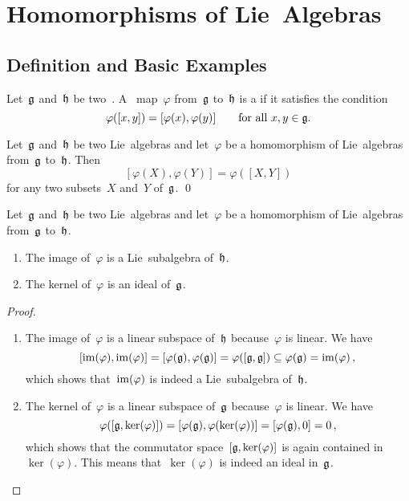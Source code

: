 \section{Homomorphisms of Lie~Algebras}



\subsection{Definition and Basic Examples}


\begin{definition}
	Let~$\mathfrak{g}$ and~$\mathfrak{h}$ be two~\liealgebras{$\kf$}.
	A~\linear{$\kf$} map~$\varphi$ from~$\mathfrak{g}$ to~$\mathfrak{h}$ is a  if it satisfies the condition
 \[
	 \varphi([x,y])
	 =
	 [\varphi(x), \varphi(y)]
	 \qquad
	 \text{for all~$x, y \in \mathfrak{g}$.}
 \]
\end{definition}


\begin{proposition}
	Let~$\mathfrak{g}$ and~$\mathfrak{h}$ be two Lie~algebras and let~$\varphi$ be a homomorphism of Lie~algebras from~$\mathfrak{g}$ to~$\mathfrak{h}$.
	Then
	\[
		[ \varphi(X), \varphi(Y) ]
		=
		\varphi( [X, Y] )
	\]
	for any two subsets~$X$ and~$Y$ of~$\mathfrak{g}$.
	\qed
\end{proposition}


\begin{proposition}
	Let~$\mathfrak{g}$ and~$\mathfrak{h}$ be two Lie~algebras and let~$\varphi$ be a homomorphism of Lie~algebras from~$\mathfrak{g}$ to~$\mathfrak{h}$.
	\begin{enumerate}
		\item
			The image of~$\varphi$ is a Lie~subalgebra of~$\mathfrak{h}$.
		\item
			The kernel of~$\varphi$ is an ideal of~$\mathfrak{g}$.
	\end{enumerate}
\end{proposition}


\begin{proof}
	\leavevmode
	\begin{enumerate}
		\item
			The image of~$\varphi$ is a linear subspace of~$\mathfrak{h}$ because~$\varphi$ is linear.
			We have
			\[
				[ \operatorname{im}(\varphi), \operatorname{im}(\varphi) ]
				=
				[ \varphi(\mathfrak{g}), \varphi(\mathfrak{g}) ]
				=
				\varphi( [\mathfrak{g}, \mathfrak{g}] )
				\subseteq
				\varphi(\mathfrak{g})
				=
				\operatorname{im}(\varphi) \,,
			\]
			which shows that~$\operatorname{im}(\varphi)$ is indeed a Lie~subalgebra of~$\mathfrak{h}$.
		\item
			The kernel of~$\varphi$ is a linear subspace of~$\mathfrak{g}$ because~$\varphi$ is linear.
			We have
			\[
				\varphi( [\mathfrak{g}, \ker(\varphi)] )
				=
				[ \varphi(\mathfrak{g}), \varphi(\ker(\varphi)) ]
				=
				[ \varphi(\mathfrak{g}), 0 ]
				=
				0 \,,
			\]
			which shows that the commutator space~$[\mathfrak{g}, \ker(\varphi)]$ is again contained in~$\ker(\varphi)$.
			This means that~$\ker(\varphi)$ is indeed an ideal in~$\mathfrak{g}$.
		\qedhere
	\end{enumerate}
\end{proof}



